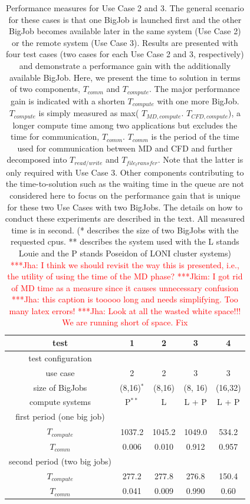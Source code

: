 \documentclass[conference,final]{IEEEtran}
\newcommand{\jhanote}[1]{ {\textcolor{red} { ***Jha: #1 }}}
\newcommand{\Jkimnote}[1]{ {\textcolor{red} { ***Jkim: #1 }}}
\newcommand{\jhanote}[1]{}
\newcommand{\Jkimnote}[1]{}
\begin{document}
\begin{table}[!h]
\begin{center}
  \caption{\small Performance measures for Use Case 2 and 3.  The
    general scenario for these cases is that one BigJob is launched
    first and the other BigJob becomes available later in the same
    system (Use Case 2) or the remote system (Use Case 3).  Results
    are presented with four test cases (two cases for each Use Case 2
    and 3, respectively) and demonstrate a performance gain with the
    additionally available BigJob. Here, we present the time to
    solution in terms of two components, ${T_{comm}}$ and
    ${T_{compute}}$. The major performance gain is indicated with a
    shorten ${T_{compute}}$ with one more BigJob.  ${T_{compute}}$ is
    simply measured as max( ${T _{MD,compute}}$. ${T_{CFD,
        compute}}$), a longer compute time among two applications but
    excludes the time for communication, ${T_{comm}}$.  ${T_{comm}}$
    is the period of the time used for communication between MD and
    CFD and further decomposed into ${T_{read/write}}$ and
    ${T_{file_transfer}}$.  Note that the latter is only required with
    Use Case 3.  Other components contributing to the time-to-solution
    such as the waiting time in the queue are not considered here to
    focus on the performance gain that is unique for these two Use
    Cases with two BigJobs.  The details on how to conduct these
    experiments are described in the text.  All measured time is in
    second. (* describes the size of two BigJobs with the requested cpus. ** describes the system used with the L stands Louie and the P stands Poseidon of LONI cluster systems)
    \jhanote{I think we should revisit the way this is
      presented, i.e., the utility of using the time of the MD phase?}
    \Jkimnote{I got rid of MD time as a measure since it causes
      unnecessary confusion} \jhanote{this caption is tooooo long and
      needs simplifying. Too many latex errors!} \jhanote{Look at all
      the wasted white space!!! We are running short of space. Fix}}
\label{table:TwoBigJobs}
\begin{tabular}{ c | c  c  c  c}
\hline
test & 1 & 2 & 3 & 4  \\

\hline
test configuration &&& \\
use case & 2 & 2 &3 &3 \\

size of BigJobs & (8,16)${^*}$  & (8,16) & (8, 16) & (16,32) \\
compute systems & P${^{**}}$  & L  &  L + P & L + P \\
\hline
first period (one big job) &   & & & \\
${T_{compute}}$ & 1037.2& 1045.2 & 1049.0 & 534.2\\
${T_{comm}}$ & 0.006 & 0.010 & 0.912 & 0.957 \\
\hline
second period (two big jobs)&   & & & \\
${T_{compute}}$ & 277.2 & 277.8& 276.8 & 150.4 \\
${T_{comm}}$ & 0.041 & 0.009 &  0.990 & 0.60 \\
\hline





\end{tabular}
\end{center}
\end{table}
\end{document}

